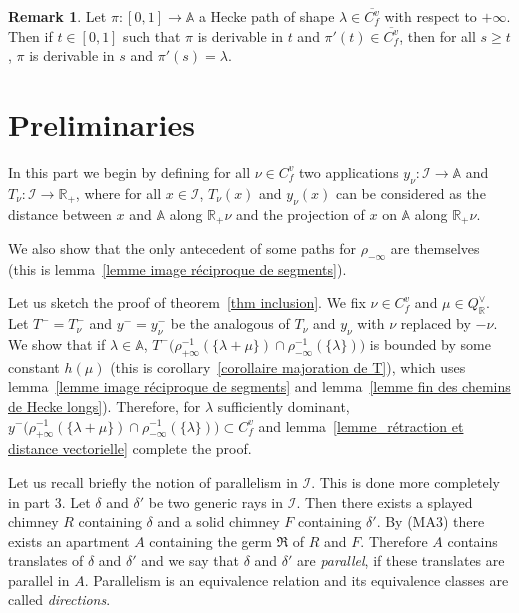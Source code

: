 \documentclass[12pt]{article}
\theoremstyle{plain}
\theoremstyle{definition}
\newtheorem{rque}[thm]{Remark}
\newcommand{\R}{\mathbb{R}}
\newcommand{\A}{\mathbb{A}}
\newcommand{\I}{\mathcal{I}}
\begin{document}
\begin{rque}\label{rque chemins de Hecke}
Let $\pi:[0,1]\rightarrow \A$ a Hecke path of shape $\lambda\in \overline{C_f^v}$ with respect to $+\infty$. Then if $t\in [0,1]$ such that $\pi$ is derivable in $t$ and $\pi'(t)\in \overline{C_f^v}$, then for all $s\geq t$, $\pi$ is derivable in $s$ and $\pi'(s)=\lambda$.
\end{rque}

\section{Preliminaries}\label{sect preliminaries}

In this part we begin by defining for all $\nu\in C_f^v$ two applications $y_\nu:\I\rightarrow \A$ and $T_\nu:\I\rightarrow \R_+$, where for all $x\in \I$, $T_\nu(x)$ and $y_\nu(x)$ can be considered as the distance between $x$ and $\A$ along $\R_+\nu$ and the projection of $x$ on $\A$ along $\R_+\nu$. 

We also show that the only antecedent of some paths for $\rho_{-\infty}$ are themselves (this is lemma~\ref{lemme image réciproque de segments}).

\vspace{3mm}

Let us sketch the proof of theorem~\ref{thm inclusion}. We fix $\nu\in C_f^v$ and $\mu\in Q^\vee_\R$. Let $T^-=T_{\nu}^-$ and $y^-=y_\nu^-$ be the analogous of $T_\nu$ and $y_\nu$ with $\nu$ replaced by $-\nu$. We show that if $\lambda\in \A$, $T^-\big(\rho_{+\infty}^{-1}(\{\lambda+\mu\})\cap \rho_{-\infty}^{-1}(\{\lambda\})\big)$ is bounded by some constant $h(\mu)$ (this is corollary~\ref{corollaire majoration de T}), which uses lemma~\ref{lemme image réciproque de segments} and lemma~\ref{lemme fin des chemins de Hecke longs}). Therefore, for $\lambda$ sufficiently dominant, $y^-\big(\rho_{+\infty}^{-1}(\{\lambda+\mu\})\cap \rho_{-\infty}^{-1}(\{\lambda\})\big)\subset C_f^v$ and lemma~\ref{lemme_rétraction et distance vectorielle} complete the proof.

\vspace{3mm}
Let us recall briefly the notion of parallelism in $\I$. This is done more completely in \cite{rousseau2011masures} part 3. Let $\delta$ and $\delta'$ be two generic rays in $\I$. Then there exists a splayed chimney $R$ containing $\delta$ and a solid chimney $F$ containing $\delta'$. By (MA3) there exists an apartment $A$ containing the germ $\mathfrak{R}$ of $R$ and $F$. Therefore $A$ contains translates of $\delta$ and $\delta'$ and we say that $\delta$ and $\delta'$ are \textit{parallel}, if these translates are parallel in $A$. Parallelism is an equivalence relation and its equivalence classes are called \textit{directions}.
\end{document}
